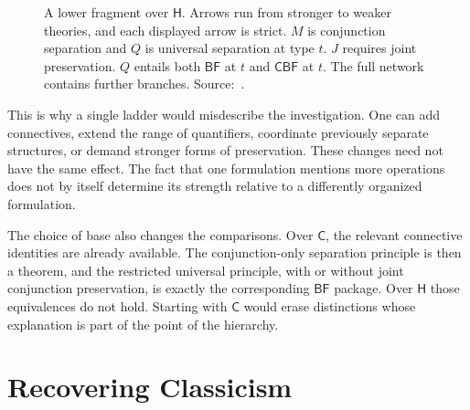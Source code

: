 \documentclass[12pt,letterpaper]{article}
\newcommand{\Hlogic}{\mathsf{H}}
\newcommand{\C}{\mathsf{C}}
\newcommand{\BF}{\mathsf{BF}}
\newcommand{\CBF}{\mathsf{CBF}}
\begin{document}
\begin{figure}[htbp]
\centering
{}

\caption{A lower fragment over $\Hlogic$. Arrows run from stronger to weaker theories, and each displayed arrow is strict. $M$ is conjunction separation and $Q$ is universal separation at type $t$. $J$ requires joint preservation. $Q$ entails both $\BF$ at $t$ and $\CBF$ at $t$. The full network contains further branches. Source:~\cite[\S\S4--5]{r3}.}
\end{figure}

This is why a single ladder would misdescribe the investigation. One can add connectives, extend the range of quantifiers, coordinate previously separate structures, or demand stronger forms of preservation. These changes need not have the same effect. The fact that one formulation mentions more operations does not by itself determine its strength relative to a differently organized formulation.


The choice of base also changes the comparisons. Over $\C$, the relevant connective identities are already available. The conjunction-only separation principle is then a theorem, and the restricted universal principle, with or without joint conjunction preservation, is exactly the corresponding $\BF$ package. Over $\Hlogic$ those equivalences do not hold. Starting with $\C$ would erase distinctions whose explanation is part of the point of the hierarchy.~\cite[\S4]{r3}


\section{Recovering Classicism}
\end{document}
